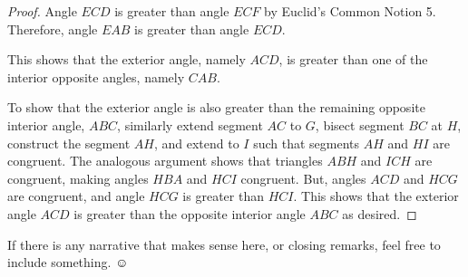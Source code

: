 \begin{proof}
Angle $ECD$ is greater than angle $ECF$ by Euclid's Common Notion 5.  Therefore, angle $EAB$ is greater than angle $ECD$. 

This shows that the exterior angle, namely $ACD$, is greater than one of the interior opposite angles, namely $CAB$.

To show that the exterior angle is also greater than the remaining opposite interior angle, $ABC$, similarly extend segment $AC$ to $G$, bisect segment $BC$ at $H$, construct the segment $AH$, and extend to $I$ such that segments $AH$ and $HI$ are congruent.  The analogous argument shows that triangles $ABH$ and $ICH$ are congruent, making angles $HBA$ and $HCI$ congruent.  But, angles $ACD$ and $HCG$ are congruent, and angle $HCG$ is greater than $HCI$.  This shows that the exterior angle $ACD$ is greater than the opposite interior angle $ABC$ as desired. \end{proof}

If there is any narrative that makes sense here, or closing remarks, feel free to include something.  $\smiley$



